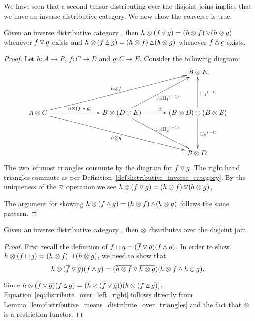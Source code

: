We have seen that a second tensor distributing over the disjoint joins implies that we have an
inverse distributive category. We now show the converse is true.
\begin{lemma}\label{lem:distributive_means_distribute_over_triangles}
  Given an inverse distributive category \X, then $h\otimes(f\operatorname{\triangledown} g) = (h\otimes f) \operatorname{\triangledown} (h\otimes g)$
  whenever $f\operatorname{\triangledown} g$ exists and $h\otimes(f\operatorname{\vartriangle} g) = (h\otimes f) \operatorname{\vartriangle} (h\otimes g)$ whenever
  $f\operatorname{\vartriangle} g$ exists.
\end{lemma}
\begin{proof}
  Let $h:A \to B$, $f:C \to D$ and $g: C \to E$. Consider the following diagram:
  \[
    \xymatrix@R+20pt@C+10pt{
      & && B\*E\\
      A\*C \ar[rr]^{h\*(f\tjdown g)} \ar[drrr]_{h\*g} \ar[urrr]^{h\*f}
        && B \* (D \+ E) \ar[r]^{\cong} \ar[ur]_{1\*\icpa} \ar[dr]^{1\*\icpb}
        & (B\*D) \+ (B \* E) \ar[d]^{\icpb} \ar[u]_{\icpa}\\
      & && B\*D.
    }
  \]
  The two leftmost  triangles commute by the diagram for $f\operatorname{\triangledown} g$. The right hand triangles
  commute as per Definition~\ref{def:distributive_inverse_category}. By the uniqueness of the
  $\operatorname{\triangledown}$ operation we see  $h\otimes(f\operatorname{\triangledown} g) = (h\otimes f)\operatorname{\triangledown}(h\otimes g)$,

  The argument for showing $h\otimes(f\operatorname{\vartriangle} g) = (h\otimes f)\operatorname{\vartriangle}(h\otimes g)$ follows the same pattern.
\end{proof}
\begin{lemma}\label{lem:distributive_means_distribute_over_join}
  Given an inverse distributive category \X, then $\otimes$ distributes over the disjoint join.
\end{lemma}
\begin{proof}
  First recall the definition of $f\sqcup g = (\overline{f}\operatorname{\triangledown}\overline{g})(f\operatorname{\vartriangle} g)$. In order
  to show $h\otimes(f\sqcup g) = (h\otimes f)\sqcup (h\otimes g)$, we need to show that
  \begin{equation}
    h\otimes(\overline{f}\operatorname{\triangledown}\overline{g})(f\operatorname{\vartriangle} g) = (\overline{h\otimes f}\operatorname{\triangledown}\overline{h\otimes g})(h\otimes f\operatorname{\vartriangle} h\otimes g).
    \label{eq:distribute_over_left_right}
  \end{equation}

  Since $h\otimes(\overline{f}\operatorname{\triangledown}\overline{g})(f\operatorname{\vartriangle} g) =
  (\overline{h}\otimes(\overline{f}\operatorname{\triangledown}\overline{g}))(h\otimes(f\operatorname{\vartriangle} g))$, Equation~\ref{eq:distribute_over_left_right}
  follows directly from  Lemma~\ref{lem:distributive_means_distribute_over_triangles} and the fact
  that $\otimes$ is a  restriction functor.
\end{proof}

